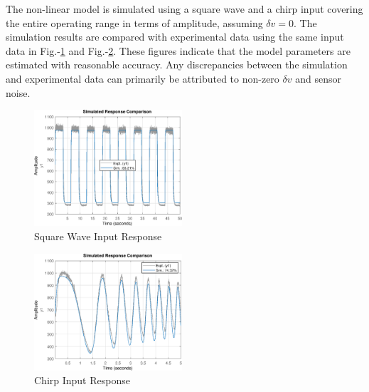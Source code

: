 The non-linear model is simulated using a square wave and a chirp input
covering the entire operating range in terms of amplitude, assuming $\delta v =
0$. The simulation results are compared with experimental data using the
same input data in Fig.-\ref{fig::sq_valid} and Fig.-\ref{fig::chirp_valid}.
These figures indicate that the model parameters are estimated with reasonable
accuracy. Any discrepancies between the simulation and experimental data can
primarily be attributed to non-zero $\delta v$ and sensor noise.
\begin{multicols}{2}
 \begin{figure}[H]
    \centering
    \includegraphics[width = 0.49\textwidth]{Part2/figs/3_figs/nl_valid/square_validation.eps}
    \caption{Square Wave Input Response}
    \label{fig::sq_valid}
\end{figure}
\begin{figure}[H]
    \centering
    \includegraphics[width = 0.49\textwidth]{Part2/figs/3_figs/nl_valid/chirp_validation.eps}
    \caption{Chirp Input Response}
    \label{fig::chirp_valid}
\end{figure}
\end{multicols}

